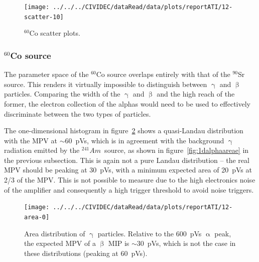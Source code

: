  
\clearpage
\begin{figure}[]
\centering
\texttt{[image: ../../../CIVIDEC/dataRead/data/plots/reportATI/12-scatter-10]}
\caption{$^{60}$Co scatter plots.}
\label{fig:scatterco}
\end{figure}

\clearpage
\subsubsection{$^{60}$Co source}
The parameter space of the $^{60}$Co source overlaps entirely with that of the $^{90}$Sr source. This renders it virtually impossible to distinguish between $\upgamma$ and $\upbeta$ particles. Comparing the width of the $\upgamma$ and $\upbeta$ and the high reach of the former, the electron collection of the alphas would need to be used to effectively discriminate between the two types of particles. 

The one-dimensional histogram in figure~\ref{fig:1dcoarea} shows a quasi-Landau distribution with the MPV at $\sim$60~pVs, which is in agreement with the background $\upgamma$ radiation emitted by the $^{241}Am$~source, as shown in figure~\ref{fig:1dalphaareae} in the previous subsection. This is again not a pure Landau distribution -- the real MPV should be peaking at 30~pVs, with a minimum expected area of 20~pVs at 2/3 of the MPV. This is not possible to measure due to the high electronics noise of the amplifier and consequently a high trigger threshold to avoid noise triggers.

\begin{figure}
\centering
\texttt{[image: ../../../CIVIDEC/dataRead/data/plots/reportATI/12-area-0]} 
\caption{Area distribution of $\upgamma$ particles. Relative to the 600~pVs $\upalpha$ peak, the expected MPV of a $\upbeta$ MIP is $\sim$30~pVs, which is not the case in these distributions (peaking at 60~pVs). }
\label{fig:1dcoarea}
\end{figure}


%



